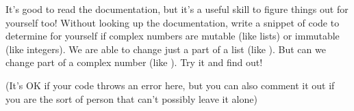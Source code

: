 \plot It's good to read the documentation, but it's a useful skill to
figure things out for yourself too!  Without looking up the
documentation, write a snippet of code to determine for yourself if
complex numbers are mutable (like lists) or immutable (like integers).
We are able to change just a part of a list (like ).  But can we change part of a complex number (like ).  Try it and find out!

(It's OK if your code throws an error here, but you can also comment
it out if you are the sort of person that can't possibly leave it
alone)\\















